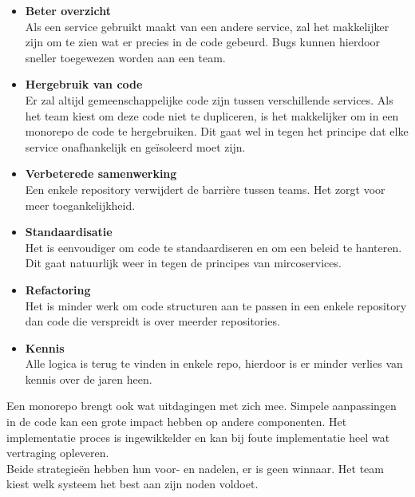 \begin{itemize}
    \item \textbf{Beter overzicht}\\
        Als een service gebruikt maakt van een andere service, zal het makkelijker zijn om te zien wat er precies in de code gebeurd. Bugs kunnen hierdoor sneller toegewezen worden aan een team.
    \item \textbf{Hergebruik van code}\\
        Er zal altijd gemeenschappelijke code zijn tussen verschillende services. Als het team kiest om deze code niet te dupliceren, is het makkelijker om in een monorepo de code te hergebruiken. Dit gaat wel in tegen het principe dat elke service onafhankelijk en geïsoleerd moet zijn.
    \item \textbf{Verbeterede samenwerking}\\
        Een enkele repository verwijdert de barrière tussen teams. Het zorgt voor meer toegankelijkheid. 
    \item \textbf{Standaardisatie}\\
        Het is eenvoudiger om code te standaardiseren en om een beleid te hanteren. Dit gaat natuurlijk weer in tegen de principes van mircoservices.
    \item \textbf{Refactoring}\\
        Het is minder werk om code structuren aan te passen in een enkele repository dan code die verspreidt is over meerder repositories.
    \item \textbf{Kennis}\\
        Alle logica is terug te vinden in enkele repo, hierdoor is er minder verlies van kennis over de jaren heen.
\end{itemize}
Een monorepo brengt ook wat uitdagingen met zich mee. Simpele aanpassingen in de code kan een grote impact hebben op andere componenten. Het implementatie proces is ingewikkelder en kan bij foute implementatie heel wat vertraging opleveren.\\ 
Beide strategieën hebben hun voor- en nadelen, er is geen winnaar. Het team kiest welk systeem het best aan zijn noden voldoet.

\newpage
